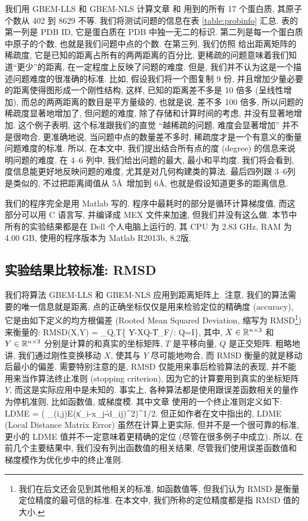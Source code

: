 \documentclass{CASthesis_zzk}
\begin{document}
我们用 GBEM-LLS 和 GBEM-NLS 计算文章 \cite{Biswas2008} 和 \cite{Sit2009}
用到的所有 17 个蛋白质, 其原子个数从 402 到 8629 不等. 
我们将测试问题的信息在表 \ref{table:probinfo} 汇总. 
表的第一列是 PDB ID, 它是蛋白质在 PDB 中独一无二的标识. 
第二列是每一个蛋白质中原子的个数, 也就是我们问题中点的个数. 
在第三列, 我们仿照 \cite{Biswas2008} 给出距离矩阵的稀疏度, 
它是已知的距离占所有的两两距离的百分比,
更稀疏的问题意味着我们知道``更少''的距离, 在一定程度上反映了问题的难度.
但是, 我们并不认为这是一个描述问题难度的很准确的标准.
比如, 假设我们将一个图复制 9 份, 并且增加少量必要的距离使得图形成一个刚性结构,
这样, 已知的距离差不多是 10 倍多 (呈线性增加), 
而总的两两距离的数目是平方量级的, 也就是说, 差不多 100 倍多, 
所以问题的稀疏度显著地增加了, 但问题的难度, 
除了存储和计算时间的考虑, 并没有显著地增加.
这个例子表明, 这个标准跟我们的直觉 \pozhe ``越稀疏的问题, 难度会显著增加''
并不是很吻合.
更准确地说, 当问题中点的数量差不多时, 稀疏度才是一个有意义的衡量问题难度的标准.
所以, 在本文中, 我们提出结合所有点的度 (degree) 的信息来说明问题的难度.
在 4--6 列中, 我们给出问题的最大, 最小和平均度.
我们将会看到, 度信息能更好地反映问题的难度, 尤其是对几何构建类的算法.
最后四列跟 3--6列是类似的, 不过把距离阈值从 5\AA ~增加到 6\AA,
也就是假设知道更多的距离信息.

我们的程序完全是用 Matlab 写的.
程序中最耗时的部分是循环计算梯度值, 
而这部分可以用 C 语言写, 并编译成 MEX 文件来加速,
但我们并没有这么做.
本节中所有的实验结果都是在 Dell 个人电脑上运行的,
其 CPU 为 2.83 GHz, RAM 为 4.00 GB, 
使用的程序版本为 Matlab R2013b, 8.2版.

\subsection{实验结果比较标准: RMSD }
\label{sec:result}
我们将算法 GBEM-LLS 和 GBEM-NLS 应用到距离矩阵上.
注意, 我们的算法需要的唯一信息就是距离,
点的正确坐标仅仅是用来检验定位的精确度 (accuracy),
它是由如下定义的均方根偏差 (Rooted Mean Squared Deviation, 缩写为 RMSD\footnote{我们在后文还会见到其他相关的标准, 如函数值等, 但我们认为 RMSD 是衡量定位精度的最可信的标准. 在本文中, 我们所称的定位精度都是指 RMSD 值的大小.}) 来衡量的:
\be RMSD(X,Y) = \min_{Q,T}\{ \|Y-XQ-T\|_{F}/: Q=I\}, \ee
其中, $X\in \mathbb{R}^{n\times 3}$ 和 $Y\in \mathbb{R}^{n\times 3}$ 
分别是计算的和真实的坐标矩阵, 
$T$ 是平移向量, $Q$ 是正交矩阵.
粗略地讲, 我们通过刚性变换移动 $X$, 使其与 $Y$ 尽可能地吻合,
而 RMSD 衡量的就是移动后最小的偏差. 
需要特别注意的是, RMSD 仅能用来事后检验算法的表现,
并不能用来当作算法终止准则 (stopping criterion), 
因为它的计算要用到真实的坐标矩阵 $Y$,
而这是实际应用中是未知的.
事实上, 各种算法都是使用跟误差函数相关的量作为停机准则,
比如函数值, 或梯度模. 
其中文章 \cite{Biswas2008} 使用的一个终止准则定义如下:
\be LDME = \Big( \sum_{(i,j)\in E}\big(\|x_i-x_j\|-d_{ij}\big)^2\Big)^{1/2}. \ee
但正如作者在文中指出的, 
LDME (Local Distance Matrix Error) 虽然在计算上更实际, 
但并不是一个很可靠的标准, 
更小的 LDME 值并不一定意味着更精确的定位 (尽管在很多例子中成立).
所以, 在前几个主要结果中, 我们没有列出函数值的相关结果, 
尽管我们使用误差函数值和梯度模作为优化步中的终止准则.
\end{document}
